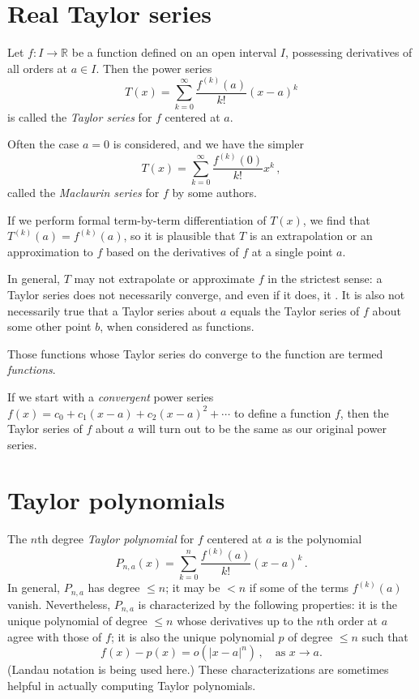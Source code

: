 \documentclass[12pt]{article}
\newcommand{\real}{\mathbb{R}}
\providecommand{\abs}[1]{\lvert#1\rvert}
\providecommand{\defnterm}[1]{\emph{#1}}
\begin{document}
\tableofcontents

\section{Real Taylor series}
Let $f\colon I \to \real$  be a function defined on an open interval $I$,
possessing derivatives of all orders at $a \in I$.
Then the power series
\[
T(x) = \sum_{k=0}^{\infty} \frac{f^{(k)}(a)}{k!}(x-a)^k 
\]
is called the \defnterm{Taylor series} for $f$ centered at $a$.

Often the case $a = 0$  is considered, and we have the simpler
\[
T(x) = \sum_{k=0}^{\infty} \frac{f^{(k)}(0)}{k!}x^k\,, 
\]
called the \defnterm{Maclaurin series} for $f$ by some authors.

If we perform formal term-by-term differentiation of $T(x)$,
we find that $T^{(k)}(a) = f^{(k)}(a)$, so it is plausible 
that $T$ is an extrapolation or an approximation to $f$ based 
on the derivatives of $f$ at a single point $a$.

In general, $T$ may not extrapolate or approximate $f$ in the strictest sense:
 a Taylor series does not necessarily converge, and even if it does, 
it .  It is also not necessarily true that a Taylor series about $a$ equals the Taylor series of $f$ about some other point $b$,
when considered as functions.

Those functions whose Taylor series do converge
to the function are termed 
\defnterm{ functions}.

If we start with a \emph{convergent} power series 
$f(x) = c_0 + c_1 (x-a) + c_2 (x-a)^2 + \dotsb$ to 
define a function $f$, then the Taylor series of $f$
about $a$ will turn out to be the same as our original power series.

\section{Taylor polynomials}
The $n$th degree \defnterm{Taylor polynomial} for $f$ centered at $a$
is the polynomial
\[
P_{n,a}(x) = \sum_{k=0}^{n} \frac{f^{(k)}(a)}{k!}(x-a)^k \,.
\]
In general, $P_{n,a}$ has degree $\leq n$;
it may be $< n$ if some of the terms $f^{(k)}(a)$
vanish.  Nevertheless, $P_{n,a}$
is characterized by the following properties:
it is the unique polynomial of degree $\leq n$
whose derivatives up to the $n$th order at $a$ agree
with those of $f$;
it is also the unique polynomial $p$ of degree $\leq n$
such that
\[
f(x) - p(x)  = o(\abs{x-a}^n)\,,  \quad \textrm{as $x \to a$}.
\]
(Landau notation is being used here.)  
These characterizations are sometimes helpful in
actually computing Taylor polynomials.
\end{document}
